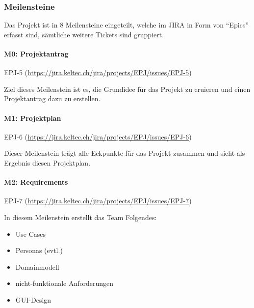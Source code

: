 \documentclass[a4paper]{article}
\def\jiraurl{https://jira.keltec.ch/jira}
\newcommand{\fulljiraissue}[1]{EPJ-#1 (\url{\jiraurl/projects/EPJ/issues/EPJ-#1})}
\begin{document}
\subsubsection{Meilensteine}

Das Projekt ist in 8 Meilensteine eingeteilt, welche im JIRA in Form von ``Epics'' erfasst sind, sämtliche weitere Tickets sind gruppiert.

\paragraph{M0: Projektantrag} \fulljiraissue{5}

Ziel dieses Meilenstein ist es, die Grundidee für das Projekt zu eruieren und einen Projektantrag dazu zu erstellen.

\paragraph{M1: Projektplan} \fulljiraissue{6}

Dieser Meilenstein trägt alle Eckpunkte für das Projekt zusammen und sieht als Ergebnis diesen Projektplan.

\paragraph{M2: Requirements} \fulljiraissue{7}


In diesem Meilenstein erstellt das Team Folgendes:

\begin{itemize}
  \item Use Cases
  \item Personas (evtl.)
  \item Domainmodell
  \item nicht-funktionale Anforderungen
  \item GUI-Design
\end{itemize}
\end{document}
